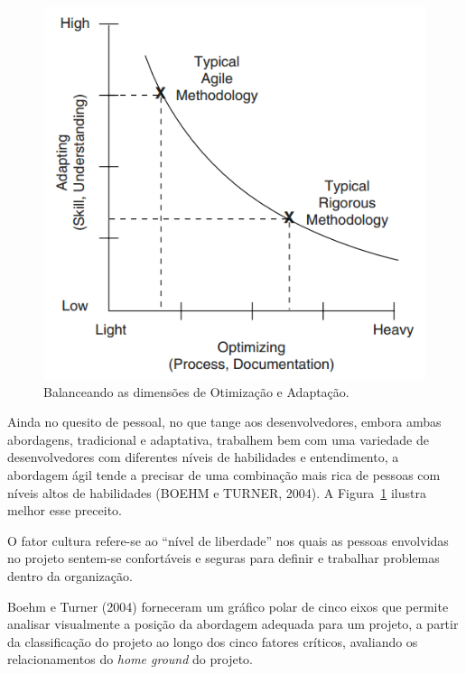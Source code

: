      
	\begin{figure}[!htbp]
	  \centering
	  \includegraphics[scale=0.5]{editaveis/figuras/balancing_Optmizing_and_Adapting_Dimensions_graph}
	  \caption[Balanceando as dimensões de Otimização e Adaptação]
	    {Balanceando as dimensões de Otimização e Adaptação.\footnotemark}
	  \label{balancing_dimensions_graph}
	\end{figure}
	
	Ainda no quesito de pessoal, no que tange aos desenvolvedores, embora ambas abordagens, tradicional e adaptativa,
	trabalhem bem com uma variedade de desenvolvedores com diferentes níveis de habilidades e entendimento, a abordagem
	ágil tende a precisar de uma combinação mais rica de pessoas com níveis altos de habilidades (BOEHM e TURNER, 2004).
	A Figura~\ref{balancing_dimensions_graph} ilustra melhor esse preceito.
	
	O fator cultura refere-se ao “nível de liberdade” nos quais as pessoas envolvidas no projeto sentem-se confortáveis
	e seguras para definir e trabalhar problemas dentro da organização.

	Boehm e Turner (2004) forneceram um gráfico polar de cinco eixos que permite analisar visualmente a posição da
	abordagem adequada para um projeto, a partir da classificação do projeto ao longo dos cinco fatores críticos,
	avaliando os relacionamentos do \textit{home ground} do projeto.
	
